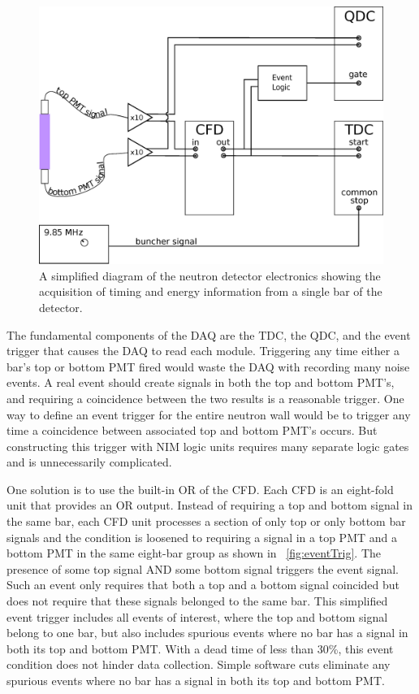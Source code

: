 \begin{figure}[htp]
\centering
\includegraphics[width=1.0\textwidth]{figures/basic_electronics.eps}
\caption[Simplified sketch of the detector electronics.]{A simplified diagram of the neutron detector electronics showing the acquisition of timing and energy information from a single bar of the detector.}
\label{fig:simpleElectronics}
\end{figure}

The fundamental components of the DAQ are the TDC, the QDC, and the event trigger that causes the DAQ to read each module.  Triggering any time either a bar's top or bottom PMT fired would waste the DAQ with recording many noise events.  A real event should create signals in both the top and bottom PMT's, and requiring a coincidence between the two results is a reasonable trigger.  One way to define an event trigger for the entire neutron wall would be to trigger any time a coincidence between associated top and bottom PMT's occurs.  But constructing this trigger with NIM logic units requires many separate logic gates and is unnecessarily complicated.  

One solution is to use the built-in OR of the CFD.  Each CFD is an eight-fold unit that provides an OR output.  Instead of requiring a top and bottom signal in the same bar, each CFD unit processes a section of only top or only bottom bar signals and the condition is loosened to requiring a signal in a top PMT and a bottom PMT in the same eight-bar group as shown in {\fig}~\ref{fig:eventTrig}.  The presence of some top signal AND some bottom signal triggers the event signal.  Such an event only requires that both a top and a bottom signal coincided but does not require that these signals belonged to the same bar.  This simplified event trigger includes all events of interest, where the top and bottom signal belong to one bar, but also includes spurious events where no bar has a signal in both its top and bottom PMT.  With a dead time of less than 30\%, this event condition does not hinder data collection.  Simple software cuts eliminate any spurious events where no bar has a signal in both its top and bottom PMT.

